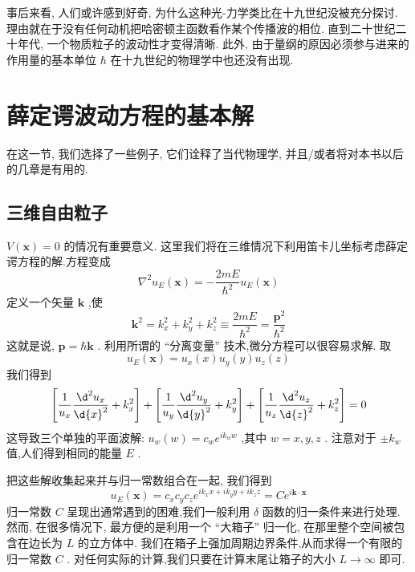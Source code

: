 \documentclass[lang=cn,newtx,10pt,scheme=chinese,thmcnt=section]{elegantbook}
\begin{document}
事后来看, 人们或许感到好奇, 为什么这种光-力学类比在十九世纪没被充分探讨. 理由就在于没有任何动机把哈密顿主函数看作某个传播波的相位. 直到二十世纪二十年代, 一个物质粒子的波动性才变得清晰. 此外, 由于量纲的原因必须参与进来的作用量的基本单位 $\hbar$ 在十九世纪的物理学中也还没有出现.
\section{薛定谔波动方程的基本解}
在这一节, 我们选择了一些例子, 它们诠释了当代物理学, 并且/或者将对本书以后的几章是有用的.
\subsection*{三维自由粒子}
$V\left( \mathbf{x}\right) = 0$ 的情况有重要意义. 这里我们将在三维情况下利用笛卡儿坐标考虑薛定谔方程的解.方程变成
\begin{equation}
	{\nabla }^{2}{u}_{E}\left( \mathbf{x}\right) = - \frac{2mE}{{\hbar }^{2}}{u}_{E}\left( \mathbf{x}\right)
\end{equation}
定义一个矢量 $\mathbf{k}$ ,使
\begin{equation}
	{\mathbf{k}}^{2} = {k}_{x}^{2} + {k}_{y}^{2} + {k}_{z}^{2} \equiv \frac{2mE}{{\hbar }^{2}} = \frac{{\mathbf{p}}^{2}}{{\hbar }^{2}}
\end{equation}
这就是说, $\mathbf{p} = \hbar \mathbf{k}$ . 利用所谓的 “分离变量” 技术,微分方程可以很容易求解. 取
\begin{equation}
	{u}_{E}\left( \mathbf{x}\right) = {u}_{x}\left( x\right) {u}_{y}\left( y\right) {u}_{z}\left( z\right)
\end{equation}
我们得到
\begin{equation}
	\left\lbrack {\frac{1}{{u}_{x}}\frac{{\d}^{2}{u}_{x}}{\d {x}^{2}} + {k}_{x}^{2}}\right\rbrack + \left\lbrack {\frac{1}{{u}_{y}}\frac{{\d}^{2}{u}_{y}}{\d{y}^{2}} + {k}_{y}^{2}}\right\rbrack + \left\lbrack {\frac{1}{{u}_{z}}\frac{{\d}^{2}{u}_{z}}{\d{z}^{2}} + {k}_{z}^{2}}\right\rbrack = 0
\end{equation}
这导致三个单独的平面波解: ${u}_{w}\left( w\right) = {c}_{w}{e}^{i{k}_{w}w}$ ,其中 $w = x, y, z$ . 注意对于 $\pm {k}_{w}$ 值,人们得到相同的能量 $E$ .

把这些解收集起来并与归一常数组合在一起, 我们得到
\begin{equation}
	{u}_{E}\left( \mathbf{x}\right) = {c}_{x}{c}_{y}{c}_{z}{e}^{i{k}_{x}x + i{k}_{y}y + i{k}_{z}z} = C{e}^{i\mathbf{k} \cdot \mathbf{x}}
\end{equation}
归一常数 $C$ 呈现出通常遇到的困难,我们一般利用 $\delta$ 函数的归一条件来进行处理. 然而, 在很多情况下, 最方便的是利用一个 “大箱子” 归一化, 在那里整个空间被包含在边长为 $L$ 的立方体中. 我们在箱子上强加周期边界条件,从而求得一个有限的归一常数 $C$ . 对任何实际的计算,我们只要在计算末尾让箱子的大小 $L \rightarrow \infty$ 即可.
\end{document}
